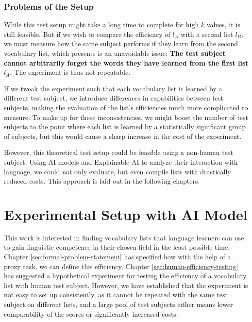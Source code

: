 \subsubsection{Problems of the Setup}
While this test setup might take a long time to complete for high $k$ values, it is still feasible.
But if we wish to compare the efficiency of $l_A$ with a second list $l_B$, we must measure how the same subject performs if they learn from the second vocabulary list, which presents is an unavoidable issue:
\textbf{The test subject cannot arbitrarily forget the words they have learned from the first list $l_A$.}
The experiment is thus not repeatable.

If we tweak the experiment such that each vocabulary list is learned by a different test subject, we introduce differences in capabilities between test subjects, making the evaluation of the list's efficiencies much more complicated to measure.
To make up for these inconsistencies, we might boost the number of test subjects to the point where each list is learned by a statistically significant group of subjects, but this would cause a sharp increase in the cost of the experiment.

However, this theoretical test setup could be feasible using a non-human test subject:
Using AI models and Explainable AI to analyze their interaction with language, we could not only evaluate, but even compile lists with drastically reduced costs.
This approach is laid out in the following chapters.

\section{Experimental Setup with AI Model} \label{sec:experimental-setup-with-ai}

This work is interested in finding vocabulary lists that language learners can use to gain linguistic competence in their chosen field in the least possible time.
Chapter \ref{sec:formal-problem-statement} has specified how with the help of a proxy task, we can define this efficiency.
Chapter \ref{sec:human-efficiency-testing} has suggested a hypothetical experiment for testing the efficiency of a vocabulary list with human test subject.
However, we have established that the experiment is not easy to set up consistently, as it cannot be repeated with the same test subject on different lists, and a large pool of test subjects either means lower comparability of the scores or significantly increased costs.

